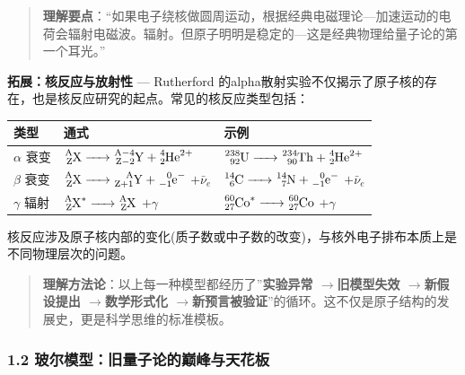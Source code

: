 \documentclass[a4paper,11pt]{ctexart}
\newcounter{none}
\newcommand{\箭}{\ensuremath{\rightarrow}}
\newcommand{\左箭}{\ensuremath{\leftarrow}}
\newcommand{\上箭}{\ensuremath{\uparrow}}
\newcommand{\下箭}{\ensuremath{\downarrow}}
\newcommand{\衡}{\ensuremath{\rightleftharpoons}}
\newcommand{\双箭}{\ensuremath{\leftrightarrow}}
\newcommand{\约等于}{\ensuremath{\approx}}
\newcommand{\小于等于}{\ensuremath{\leq}}
\newcommand{\大于等于}{\ensuremath{\geq}}
\newcommand{\不等于}{\ensuremath{\neq}}
\newcommand{\西格马}{\ensuremath{\sigma}}
\newcommand{\派}{\ensuremath{\pi}}
\begin{document}
\begin{quote}
\textbf{理解要点}：``如果电子绕核做圆周运动，根据经典电磁理论---加速运动的电荷会辐射电磁波。辐射。但原子明明是稳定的---这是经典物理给量子论的第一个耳光。''
\end{quote}

\textbf{拓展：核反应与放射性} --- Rutherford 的alpha散射实验不仅揭示了原子核的存在，也是核反应研究的起点。常见的核反应类型包括：

{\def\LTcaptype{none} %
\begin{longtable}[]{@{}
  >{\raggedright\arraybackslash}p{}
  >{\raggedright\arraybackslash}p{}
  >{\raggedright\arraybackslash}p{}@{}}
\toprule\noalign{}
\begin{minipage}[b]{\linewidth}\raggedright
类型
\end{minipage} & \begin{minipage}[b]{\linewidth}\raggedright
通式
\end{minipage} & \begin{minipage}[b]{\linewidth}\raggedright
示例
\end{minipage} \\
\midrule\noalign{}
\endhead
\bottomrule\noalign{}
\endlastfoot
\(\alpha\) 衰变 & \(\ce{^{A}_{Z}X -> ^{A-4}_{Z-2}Y + ^{4}_{2}He^{2+}}\) & \(\ce{^{238}_{92}U -> ^{234}_{90}Th + ^{4}_{2}He^{2+}}\) \\
\(\beta\) 衰变 & \(\ce{^{A}_{Z}X -> ^{A}_{Z+1}Y + ^{0}_{-1}e^{-}}\) \(+ \bar{\nu}_e\) & \(\ce{^{14}_{6}C -> ^{14}_{7}N + ^{0}_{-1}e^{-}}\) \(+ \bar{\nu}_e\) \\
\(\gamma\) 辐射 & \(\ce{^{A}_{Z}X^{*} -> ^{A}_{Z}X}\) \(+ \gamma\) & \(\ce{^{60}_{27}Co^{*} -> ^{60}_{27}Co}\) \(+ \gamma\) \\
\end{longtable}
}

核反应涉及原子核内部的变化(质子数或中子数的改变)，与核外电子排布本质上是不同物理层次的问题。

\begin{quote}
\textbf{理解方法论}：以上每一种模型都经历了''\textbf{实验异常 \箭 旧模型失效 \箭 新假设提出 \箭 数学形式化 \箭 新预言被验证}''的循环。这不仅是原子结构的发展史，更是科学思维的标准模板。
\end{quote}

\subsubsection{1.2 玻尔模型：旧量子论的巅峰与天花板}\label{ux73bbux5c14ux6a21ux578bux65e7ux91cfux5b50ux8bbaux7684ux5dc5ux5cf0ux4e0eux5929ux82b1ux677f}
\end{document}
